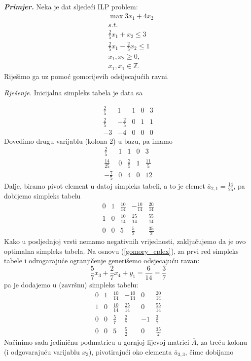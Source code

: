 \documentclass[a4paper, utf8, 11pt, colorlinks]{book}
\begin{document}
\emph{\textbf{Primjer.}} Neka je dat sljedeći ILP problem:\\
$$\begin{array}{ll}
    &\max 3 x_1 + 4 x_2 \\
    & {s.t. }  \\
    & \frac{2}{5}x_1 + x_2 \leq 3 \\
    &\frac{2}{5}x_1 - \frac{2}{5}x_2 \leq 1 \\
    &x_1, x_2 \geq 0, \\
    &  x_1, x_1 \in \mathbb{Z}.
\end{array}$$
Riješimo ga uz pomoć gomorijevih odsijecajućih ravni. 

\emph{Rješenje.}
Inicijalna simpleks tabela je data sa 

$$\begin{array}{cccc|c}
   \frac{2}{5}           & 1               & 1 & 0 & 3 \\
   \frac{2}{5}           & -\frac{2}{5}    & 0 & 1 & 1 \\ \hline
   -3                    &  -4             & 0 & 0 & 0
\end{array}$$
Dovedimo drugu varijablu (kolona 2) u bazu, pa imamo 
$$\begin{array}{cccc|c}
   \frac{2}{5}           & 1               & 1           & 0 & 3 \\
   \frac{14}{25}         & 0               & \frac{2}{5} & 1 & \frac{11}{5}\\ \hline
   -\frac{7}{5}                  & 0               &4 & 0 & 12
\end{array}$$
Dalje, biramo pivot element u datoj simpleks tabeli, a to je elemet $\overline{a}_{2,1} = \frac{14}{25}$, pa dobijemo simpleks tabelu
$$
\begin{array}{cccc|c}
    0    &  1  &  \frac{10}{14} &  -\frac{10}{14}  &  \frac{20}{14}                  \\
    1    &  0  &  \frac{10}{14} &   \frac{25}{14}  &   \frac{55}{14}\\ \hline
    0    &  0  &  5             &    \frac{5}{2}   &    \frac{35}{2}
\end{array}
$$
Kako u posljednjoj vrsti nemamo negativnih vrijednosti, zaključujemo da je ovo optimalna simpleks tabela. Na osnovu (\ref{gomory_cplex}),   za prvi red simpleks tabele i odrogarajuće ogranjičenje generišemo odsjecajuću ravan:
$$   \frac{5}{7}x_3 + \frac{2}{7} x_4 +      y_1   = \frac{6}{14}=\frac{3}{7}$$
pa je dodajemo u (završnu) simpleks tabelu:
$$
\begin{array}{ccccc|c}
    0    &  1  &  \frac{10}{14} &  -\frac{10}{14}  &  0 & \frac{20}{14}                  \\
    1    &  0  &  \frac{10}{14} &   \frac{25}{14}  &  0 & \frac{55}{14}\\ 
    0    &  0  & \frac{5}{7}    &   \frac{2}{7}    &  -1 & \frac{3}{7}  \\
     \hline 
    0    &  0  &  5             &    \frac{5}{2}   &  0 &    \frac{35}{2}
\end{array}
$$
Načinimo sada jediničnu podmatricu u gornjoj lijevoj matrici $\overline{A}$, za treću kolonu (i odgovarajuću varijablu $x_3$), pivotirajući oko elementa $\overline{a}_{3,3}$, čime dobijamo 
\end{document}
